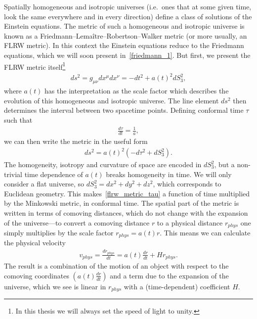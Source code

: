     Spatially homogeneous and isotropic universes (i.e.\ ones that at some given
    time, look the same everywhere and in every direction)
    define a class of solutions of the Einstein equations.
    The metric of such a homogeneous and isotropic universe
    is known as a Friedmann–Lemaître–Robertson–Walker metric
    (or more usually, an FLRW metric). In this context
    the Einstein equations reduce to the Friedmann equations, which we will soon present
    in~\eqref{friedmann_1}.
    But first, we present the FLRW metric itself\footnote{
        In this thesis we will always set the speed of light to unity.
    }
    \begin{align}\label{flrw_metric}
        ds^2 = g_{\mu\nu}dx^{\mu}dx^{\nu} = - dt^2 + a(t)^2 dS_3^2,
    \end{align}
    where $a(t)$ has the interpretation as the scale factor
    which describes the evolution of this homogeneous and isotropic universe.
    The line element $ds^2$ then determines the interval between two spacetime points.
    Defining conformal time $\tau$ such that
    \begin{align}\label{conformal_time_defn}
        \frac{d\tau}{dt} = \frac{1}{a},
    \end{align}
    we can then write the metric in the useful form
    \begin{align}\label{flrw_metric_tau}
        ds^2 = a(t)^2\left(-d\tau^2 + dS_3^2\right).
    \end{align}
    The homogeneity, isotropy and curvature of space are encoded in $dS^2_3$,
    but a non-trivial time dependence of $a(t)$ breaks homogeneity in time.
    We will only consider a flat universe, so $dS_3^2=dx^2+dy^2+dz^2$,
    which corresponds to Euclidean geometry.
    This makes~\eqref{flrw_metric_tau} a function of time multiplied by the Minkowski metric,
    in conformal time.
    The spatial part of the metric is written in terms of comoving distances, which
    do not change with the expansion of the universe---to convert a comoving distance $r$
    to a physical distance $r_{phys}$ one simply multiplies by the scale factor $r_{phys}=a(t)r$.
    This means we can calculate the physical velocity
    \begin{align}
        v_{phys} = \frac{dr_{phys}}{dt} = a(t)\frac{dr}{dt}+Hr_{phys}.
    \end{align}
    The result is a combination of the motion of an object with respect to the comoving coordinates
    $\left(a(t)\frac{dr}{dt}\right)$ and a term due to the expansion of the universe, which we see is linear
    in $r_{phys}$ with a (time-dependent) coefficient $H$.


